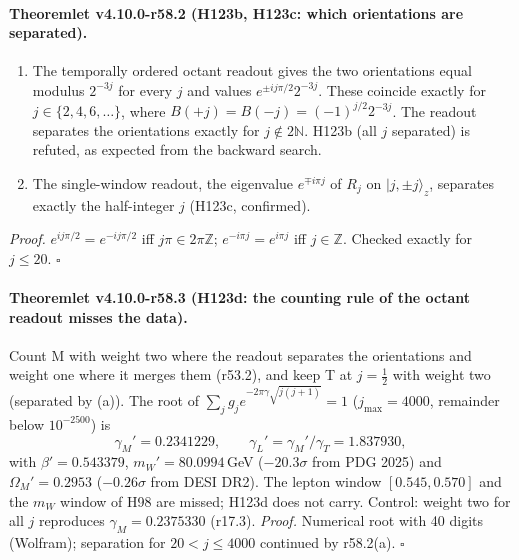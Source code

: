 \paragraph{Theoremlet v4.10.0-r58.2 (H123b, H123c: which orientations are separated).}
\begin{enumerate}[leftmargin=2em]
\item[(a)] The temporally ordered octant readout gives the two orientations equal modulus \(2^{-3j}\) for every \(j\) and values \(e^{\pm ij\pi/2}2^{-3j}\).
These coincide exactly for \(j\in\{2,4,6,\dots\}\), where \(B(+j)=B(-j)=(-1)^{j/2}2^{-3j}\).  The readout separates the orientations exactly for \(j\notin2\mathbb N\).
H123b (all \(j\) separated) is refuted, as expected from the backward search.
\item[(b)] The single-window readout, the eigenvalue \(e^{\mp i\pi j}\) of \(R_j\) on \(|j,\pm j\rangle_z\), separates exactly the half-integer \(j\) (H123c, confirmed).
\end{enumerate}
\emph{Proof.} \(e^{ij\pi/2}=e^{-ij\pi/2}\) iff \(j\pi\in2\pi\mathbb Z\); \(e^{-i\pi j}=e^{i\pi j}\) iff \(j\in\mathbb Z\).  Checked exactly for \(j\le20\).  \(\square\)

\paragraph{Theoremlet v4.10.0-r58.3 (H123d: the counting rule of the octant readout misses the data).}
Count M with weight two where the readout separates the orientations and weight one where it merges them (r53.2), and keep T at \(j=\tfrac12\) with
weight two (separated by (a)).  The root of \(\sum_jg_je^{-2\pi\gamma\sqrt{j(j+1)}}=1\) (\(j_{\max}=4000\), remainder below \(10^{-2500}\)) is
\[
\gamma_M'=0.2341229,\qquad \gamma_L'=\gamma_M'/\gamma_T=1.837930,
\]
with \(\beta'=0.543379\), \(m_W'=80.0994\)\,GeV (\(-20.3\sigma\) from PDG 2025) and \(\Omega_M'=0.2953\) (\(-0.26\sigma\) from DESI DR2).  The lepton window
\([0.545,0.570]\) and the \(m_W\) window of H98 are missed; H123d does not carry.  Control: weight two for all \(j\) reproduces \(\gamma_M=0.2375330\) (r17.3).
\emph{Proof.} Numerical root with 40 digits (Wolfram); separation for \(20<j\le4000\) continued by r58.2(a).  \(\square\)

